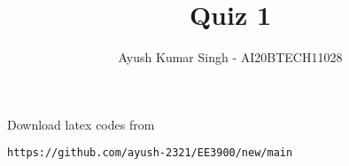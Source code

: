 \documentclass[journal,12pt,twocolumn]{IEEEtran}
\DeclareMathOperator*{\Res}{Res}
\begin{document}
\newcommand{\BEQA}{\begin{eqnarray}}
\newcommand{\EEQA}{\end{eqnarray}}
\newcommand{\define}{\stackrel{\triangle}{=}}

\raggedbottom
\setlength{\parindent}{0pt}
\providecommand{\mbf}{\mathbf}
\providecommand{\pr}[1]{\ensuremath{\Pr\left(#1\right)}}
\providecommand{\qfunc}[1]{\ensuremath{Q\left(#1\right)}}
\providecommand{\sbrak}[1]{\ensuremath{{}\left[#1\right]}}
\providecommand{\lsbrak}[1]{\ensuremath{{}\left[#1\right.}}
\providecommand{\rsbrak}[1]{\ensuremath{{}\left.#1\right]}}
\providecommand{\brak}[1]{\ensuremath{\left(#1\right)}}
\providecommand{\lbrak}[1]{\ensuremath{\left(#1\right.}}
\providecommand{\rbrak}[1]{\ensuremath{\left.#1\right)}}
\providecommand{\cbrak}[1]{\ensuremath{\left\{#1\right\}}}
\providecommand{\lcbrak}[1]{\ensuremath{\left\{#1\right.}}
\providecommand{\rcbrak}[1]{\ensuremath{\left.#1\right\}}}
\theoremstyle{remark}
\newtheorem{rem}{Remark}
\newcommand{\sgn}{\mathop{\mathrm{sgn}}}
\newcommand{\comb}[2]{{}^{#1}\mathrm{C}_{#2}}
 
\providecommand{\abs}[1]{\vert#1\vert}
\providecommand{\res}[1]{\Res\displaylimits_{#1}} 
\providecommand{\norm}[1]{\lVert#1\rVert}
\providecommand{\mtx}[1]{\mathbf{#1}}
\providecommand{\mean}[1]{E[ #1 ]}
\providecommand{\fourier}{\overset{\mathcal{F}}{ \rightleftharpoons}}
\providecommand{\system}{\overset{\mathcal{H}}{ \longleftrightarrow}}
\newcommand{\solution}{\noindent \textbf{Solution: }}
\newcommand{\cosec}{\,\text{cosec}\,}
\providecommand{\dec}[2]{\ensuremath{\overset{#1}{\underset{#2}{\gtrless}}}}
\newcommand{\myvec}[1]{\ensuremath{\begin{pmatrix}#1\end{pmatrix}}}
\newcommand{\mydet}[1]{\ensuremath{\begin{vmatrix}#1\end{vmatrix}}}
\makeatletter
{}
\makeatother
\let\StandardTheFigure\thefigure
\let\vec\mathbf
\renewcommand{\thefigure}{\theproblem}
\def\putbox#1#2#3{\makebox[0in][l]{\makebox[#1][l]{}\raisebox{\baselineskip}[0in][0in]{\raisebox{#2}[0in][0in]{#3}}}}
     \def\rightbox#1{\makebox[0in][r]{#1}}
     \def\centbox#1{\makebox[0in]{#1}}
     \def\topbox#1{\raisebox{-\baselineskip}[0in][0in]{#1}}
     \def\midbox#1{\raisebox{-0.5\baselineskip}[0in][0in]{#1}}
\vspace{3cm}
\title{Quiz 1}
\author{Ayush Kumar Singh - AI20BTECH11028}
\maketitle
\newpage
\bigskip
\renewcommand{\thefigure}{\theenumi}
\renewcommand{\thetable}{\theenumi}
%
Download latex codes from 
%
\begin{lstlisting}
https://github.com/ayush-2321/EE3900/new/main
\end{lstlisting}
\end{document}
